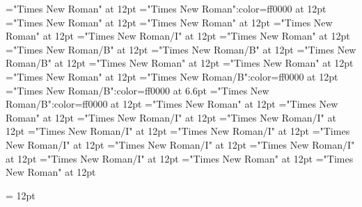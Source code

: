 \documentclass[a4paper]{article}
\begin{document}
 
\pagestyle{plain} 
\sloppy 
\setlength{\parfillskip}{0pt plus 1fil} 
\font\spanen="Times New Roman" at 12pt
\font\spanur="Times New Roman":color=ff0000 at 12pt
\font\diven="Times New Roman" at 12pt
\font\divur="Times New Roman" at 12pt
\font\xitemxitemdefinitionbefore="Times New Roman" at 12pt
\font\xitemxitemexamplebefore="Times New Roman/I" at 12pt
\font\xitemxitemexamplesbefore="Times New Roman" at 12pt
\font\xitemxitemheadwordbefore="Times New Roman/B" at 12pt
\font\xitemxitemheadwordminorbefore="Times New Roman/B" at 12pt
\font\xitemxitemLexEntrypublishRootMinorPrimaryTargetHeadWordRefbefore="Times New Roman/B" at 12pt
\font\xitemxitemlexreftargetsbefore="Times New Roman" at 12pt
\font{}="Times New Roman" at 12pt
\font\entryletDatadicBody="Times New Roman" at 12pt
\font\headwordurentryletDatadicBody="Times New Roman/B":color=ff0000 at 12pt
\font\xhomographnumberheadwordurentryletDatadicBody="Times New Roman/B":color=ff0000 at 6.6pt
\font\spanenheadwordurentryletDatadicBody="Times New Roman/B":color=ff0000 at 12pt
\font\sensesentryletDatadicBody="Times New Roman" at 12pt
\font\sensesensesentryletDatadicBody="Times New Roman" at 12pt
\font\grammaticalinfosensesensesentryletDatadicBody="Times New Roman/I" at 12pt
\font\partofspeechengrammaticalinfosensesensesentryletDatadicBody="Times New Roman/I" at 12pt
\font\spanenpartofspeechengrammaticalinfosensesensesentryletDatadicBody="Times New Roman/I" at 12pt
\font\slotsgrammaticalinfosensesensesentryletDatadicBody="Times New Roman/I" at 12pt
\font\spanenslotsgrammaticalinfosensesensesentryletDatadicBody="Times New Roman/I" at 12pt
\font\slotnameenslotsgrammaticalinfosensesensesentryletDatadicBody="Times New Roman/I" at 12pt
\font\spanenslotnameenslotsgrammaticalinfosensesensesentryletDatadicBody="Times New Roman/I" at 12pt
\font\spanengrammaticalinfosensesensesentryletDatadicBody="Times New Roman/I" at 12pt
\font{}="Times New Roman" at 12pt
\font\spanendefinitionensensesensesentryletDatadicBody="Times New Roman" at 12pt

\pagestyle{fancy} 
\setlength{\columnsep}{1.5em} 
\setlength\columnseprule{0.4pt} 
\begin{multicols}{2}{\raggedleft} \begin{spacing}{1.5}
\hangindent= 12pt
  \spanenslotsgrammaticalinfosensesensesentryletDatadicBody{: }  \end{spacing}
 \end{multicols}
\end{document}
